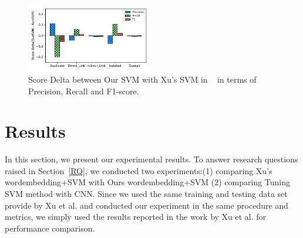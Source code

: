 \documentclass[sigconf,review, anonymous]{acmart}
\theoremstyle{break}
\begin{document}
\begin{figure}[!htp]
    \centering
     \includegraphics[width=0.49\textwidth]{pic/OurSVM-Xu'sSVM.pdf} %
    \caption{Score Delta between Our SVM with Xu's SVM in ~\cite{xu2016predicting} in terms of Precision, Recall and F1-score.}
    \label{fig:OurSVM-Xu'sSVM}
\end{figure}

\section{Results}
In this section, we present our experimental results. To answer research questions raised in
Section~\ref{RQ}, we conducted two experiments:(1) comparing Xu's wordembedding+SVM with Ours wordembedding+SVM (2) comparing Tuning SVM method with CNN. Since we used the same training and testing data set provide by Xu
et al.\cite{xu2016predicting} and conducted our experiment in the same procedure and metrics, we simply used the results reported in the work by Xu et al.\cite{xu2016predicting} for performance comparison. 

\end{document}
